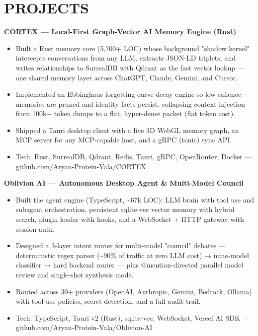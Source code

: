 \documentclass[9pt]{article}
\begin{document}
\section*{PROJECTS}
\textbf{CORTEX  ---  Local-First Graph-Vector AI Memory Engine (Rust)}
\vspace{1pt}
\begin{itemize}[leftmargin=11pt,itemsep=0pt,topsep=1pt,parsep=0pt]
\item Built a Rust memory core (5,700+ LOC) whose background "shadow kernel" intercepts conversations from any LLM, extracts JSON-LD triplets, and writes relationships to SurrealDB with Qdrant as the fast vector lookup  ---  one shared memory layer across ChatGPT, Claude, Gemini, and Cursor.
\item Implemented an Ebbinghaus forgetting-curve decay engine so low-salience memories are pruned and identity facts persist, collapsing context injection from 100k+ token dumps to a flat, hyper-dense packet (flat token cost).
\item Shipped a Tauri desktop client with a live 3D WebGL memory graph, an MCP server for any MCP-capable host, and a gRPC (tonic) sync API.
\item Tech: Rust, SurrealDB, Qdrant, Redis, Tauri, gRPC, OpenRouter, Docker  ---  github.com/Aryan-Protein-Vala/CORTEX
\end{itemize}
\textbf{Oblivion AI  ---  Autonomous Desktop Agent \& Multi-Model Council}
\vspace{1pt}
\begin{itemize}[leftmargin=11pt,itemsep=0pt,topsep=1pt,parsep=0pt]
\item Built the agent engine (TypeScript, \textasciitilde{}67k LOC): LLM brain with tool use and subagent orchestration, persistent sqlite-vec vector memory with hybrid search, plugin loader with hooks, and a WebSocket + HTTP gateway with session auth.
\item Designed a 3-layer intent router for multi-model "council" debates  ---  deterministic regex parser (\textasciitilde{}90\% of traffic at zero LLM cost) → nano-model classifier → hard backend router  ---  plus @mention-directed parallel model review and single-shot synthesis mode.
\item Routed across 30+ providers (OpenAI, Anthropic, Gemini, Bedrock, Ollama) with tool-use policies, secret detection, and a full audit trail.
\item Tech: TypeScript, Tauri v2 (Rust), sqlite-vec, WebSocket, Vercel AI SDK  ---  github.com/Aryan-Protein-Vala/Oblivion-AI
\end{itemize}
\end{document}
